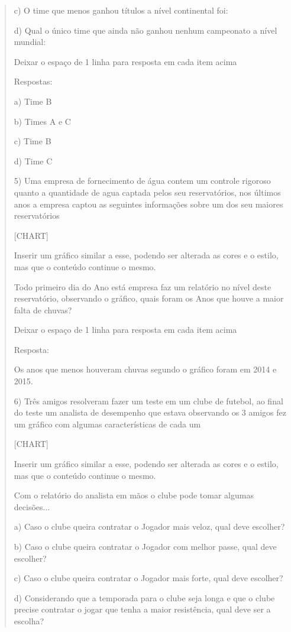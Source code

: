 \begin{quote}
\begin{escolha}
c) O time que menos ganhou títulos a nível continental foi:

d) Qual o único time que ainda não ganhou nenhum campeonato a nível
mundial:

Deixar o espaço de 1 linha para resposta em cada item acima

Respostas:

a) Time B

b) Times A e C

c) Time B

d) Time C

5) Uma empresa de fornecimento de água contem um controle rigoroso
quanto a quantidade de agua captada pelos seu reservatórios, nos últimos
anos a empresa captou as seguintes informações sobre um dos seu maiores
reservatórios

{{[}CHART{]}}

Inserir um gráfico similar a esse, podendo ser alterada as cores e o
estilo, mas que o conteúdo continue o mesmo.

Todo primeiro dia do Ano está empresa faz um relatório no nível deste
reservatório, observando o gráfico, quais foram os Anos que houve a
maior falta de chuvas?

Deixar o espaço de 1 linha para resposta em cada item acima

Resposta:

Os anos que menos houveram chuvas segundo o gráfico foram em 2014 e
2015.

6) Três amigos resolveram fazer um teste em um clube de futebol, ao
final do teste um analista de desempenho que estava observando os 3
amigos fez um gráfico com algumas características de cada um

{{[}CHART{]}}

Inserir um gráfico similar a esse, podendo ser alterada as cores e o
estilo, mas que o conteúdo continue o mesmo.

Com o relatório do analista em mãos o clube pode tomar algumas
decisões...

a) Caso o clube queira contratar o Jogador mais veloz, qual deve
escolher?

b) Caso o clube queira contratar o Jogador com melhor passe, qual deve
escolher?

c) Caso o clube queira contratar o Jogador mais forte, qual deve
escolher?

d) Considerando que a temporada para o clube seja longa e que o clube
precise contratar o jogar que tenha a maior resistência, qual deve ser a
escolha?


\end{escolha}
\end{quote}
